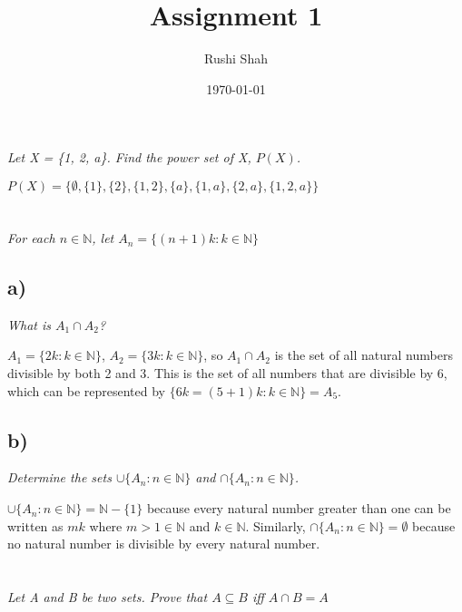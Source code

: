 \documentclass[]{article}
\author{Rushi Shah}
\date{\today}
\title{Assignment 1}
\newcommand{\naturals}{\mathbb{N}}
\begin{document}
	\maketitle

	\section{}
		\textit{Let X = \{1, 2, a\}. Find the power set of X, $P(X)$.}


		$P(X) = \{\emptyset, \{1\}, \{2\}, \{1, 2\}, \{a\}, \{1, a\}, \{2, a\}, \{1, 2, a\}\}$

	\section{}
		\textit{For each $n \in \naturals$, let $A_n = \{(n + 1)k : k \in \naturals\}$}
		\subsection*{a)}

			\textit{What is $A_1 \cap A_2$?}

				$A_1 = \{2k : k \in \naturals\}$, $A_2 = \{3k : k \in \naturals\}$, so $A_1 \cap A_2$ is the set of all natural numbers divisible by both 2 and 3. This is the set of all numbers that are divisible by 6, which can be represented by $\{6k = (5 + 1)k : k \in \naturals\} = A_5$.
		
		\subsection*{b)}
			\textit{Determine the sets $\cup\{A_n : n \in \naturals \}$ and $\cap\{A_n : n \in \naturals\}$.}

				$\cup\{A_n : n \in \naturals \} = \naturals - \{1\}$ because every natural number greater than one can be written as $mk$ where $m > 1 \in \naturals$ and $k \in \naturals$. Similarly, $\cap\{A_n : n \in \naturals\} = \emptyset$ because no natural number is divisible by every natural number. 

	\section{}
		\textit{Let A and B be two sets. Prove that $A \subseteq B$ iff $A \cap B = A$}
\end{document}
